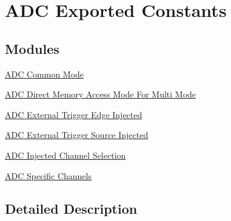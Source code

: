 \hypertarget{group___a_d_c_ex___exported___constants}{}\section{A\+DC Exported Constants}
\label{group___a_d_c_ex___exported___constants}
\subsection*{Modules}
\begin{DoxyCompactItemize}
\item 
\hyperlink{group___a_d_c_ex___common__mode}{A\+D\+C Common Mode}
\item 
\hyperlink{group___a_d_c_ex___direct__memory__access__mode__for__multi__mode}{A\+D\+C Direct Memory Access Mode For Multi Mode}
\item 
\hyperlink{group___a_d_c_ex___external__trigger__edge___injected}{A\+D\+C External Trigger Edge Injected}
\item 
\hyperlink{group___a_d_c_ex___external__trigger___source___injected}{A\+D\+C External Trigger Source Injected}
\item 
\hyperlink{group___a_d_c_ex__injected__channel__selection}{A\+D\+C Injected Channel Selection}
\item 
\hyperlink{group___a_d_c_ex__channels}{A\+D\+C Specific Channels}
\end{DoxyCompactItemize}


\subsection{Detailed Description}

